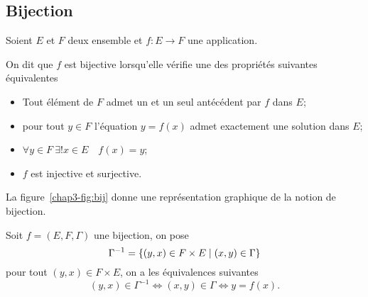 \subsection{Bijection}
\label{chap3-subsubsec:bijection}
Soient \(E\) et \(F\) deux ensemble et \(f:E \longrightarrow F\) une application.
\begin{defdef}
  On dit que \(f\) est bijective lorsqu'elle vérifie une des propriétés suivantes équivalentes
  \begin{itemize}
  \item Tout élément de \(F\) admet un et un seul antécédent par \(f\) dans \(E\);
  \item pour tout \(y \in F\) l'équation \(y=f(x)\) admet exactement une solution dans \(E\);
  \item \(\forall y \in F \ \exists! x \in E \quad f(x)=y\);
  \item \(f\) est injective et surjective.
  \end{itemize}
La figure~\ref{chap3-fig:bij} donne une représentation graphique de la notion de bijection.
\end{defdef}
%
Soit \(f=(E,F,\Gamma)\) une bijection, on pose 
\begin{equation}
\Gamma^{-1}=\left\{(y,x) \in F \times E\mathrel{}\middle|\mathrel{}(x,y) \in \Gamma\right\}
\end{equation}
pour tout \((y,x) \in F \times E\), on a les équivalences suivantes
\begin{equation}
  (y,x) \in \Gamma^{-1} \iff (x,y) \in \Gamma \iff y=f(x).
\end{equation}

